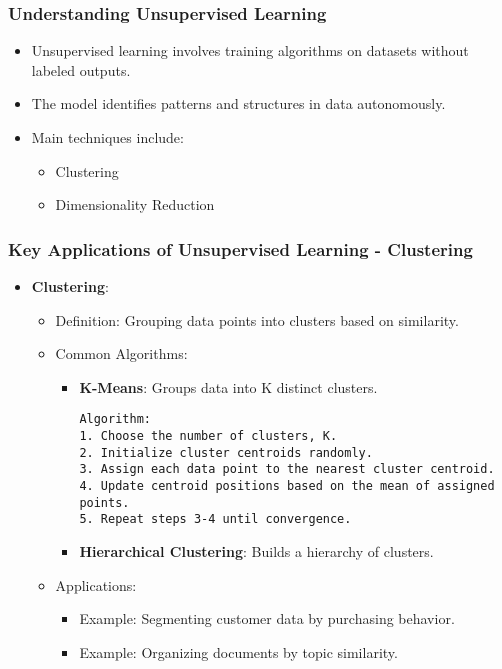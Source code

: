 \documentclass[aspectratio=169]{beamer}
\begin{document}
\begin{frame}[fragile]
    \frametitle{Understanding Unsupervised Learning}
    \begin{itemize}
        \item Unsupervised learning involves training algorithms on datasets without labeled outputs.
        \item The model identifies patterns and structures in data autonomously.
        \item Main techniques include:
        \begin{itemize}
            \item Clustering
            \item Dimensionality Reduction
        \end{itemize}
    \end{itemize}
\end{frame}

\begin{frame}[fragile]
    \frametitle{Key Applications of Unsupervised Learning - Clustering}
    \begin{itemize}
        \item \textbf{Clustering}:
        \begin{itemize}
            \item Definition: Grouping data points into clusters based on similarity.
            \item Common Algorithms:
            \begin{itemize}
                \item \textbf{K-Means}: Groups data into K distinct clusters.
                \begin{lstlisting}
Algorithm:
1. Choose the number of clusters, K.
2. Initialize cluster centroids randomly.
3. Assign each data point to the nearest cluster centroid.
4. Update centroid positions based on the mean of assigned points.
5. Repeat steps 3-4 until convergence.
                \end{lstlisting}
                \item \textbf{Hierarchical Clustering}: Builds a hierarchy of clusters.
            \end{itemize}
            \item Applications:
            \begin{itemize}
                \item Example: Segmenting customer data by purchasing behavior.
                \item Example: Organizing documents by topic similarity.
            \end{itemize}
        \end{itemize}
    \end{itemize}
\end{frame}
\end{document}
